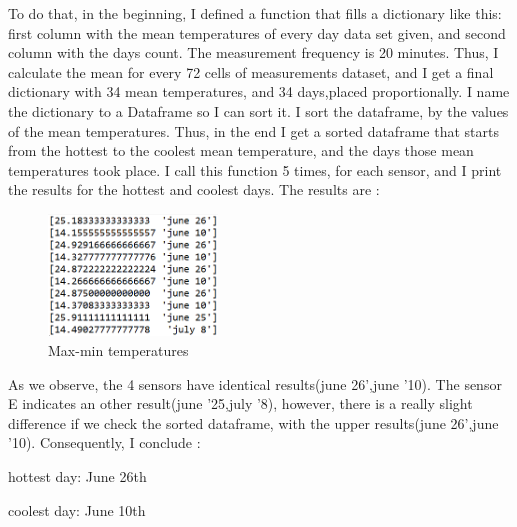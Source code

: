 \documentclass[a4paper,12pt]{article} %
\begin{document}
\setlength{\parindent}{8ex}To do that, in the beginning, I defined a function that fills a dictionary like this: first column with the mean temperatures of every day data set given, and second column with the days count. The measurement frequency is 20 minutes. Thus, I calculate the mean for every 72 cells of measurements dataset, and I get a final dictionary with 34 mean temperatures, and 34 days,placed proportionally. I name the dictionary to a Dataframe so I can sort it. I sort the dataframe, by the values of the mean temperatures. Thus, in the end I get a sorted dataframe that starts from the hottest to the coolest mean temperature, and the days those mean temperatures took place. I call this function 5 times, for each sensor, and I print the results for the hottest and coolest days. The results are :
\begin{figure}[H]   
	\centering 
	\includegraphics[width=0.4\textwidth]{MaxMin.png}
	\caption{Max-min temperatures} 
\end{figure}
\vspace{5mm}

\setlength{\parindent}{8ex} As we observe, the 4 sensors have identical results(june 26',june '10). The sensor E indicates an other result(june '25,july '8), however, there is a really slight difference if we check the sorted dataframe, with the upper results(june 26',june '10). Consequently, I conclude :

\setlength{\parindent}{12ex}hottest day: June 26th

\setlength{\parindent}{12ex}coolest day: June 10th





\end{document}
